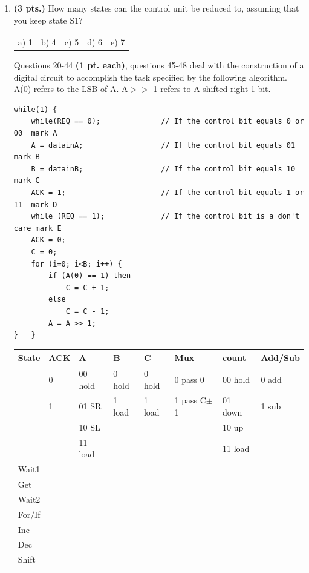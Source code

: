 \documentclass{article}
\begin{document}
\begin{enumerate}
\item {\bf (3 pts.)} How many states can the control unit be
reduced to, assuming that you keep state S1?

\begin{tabular}{p{0.75in}p{0.75in}p{0.75in}p{0.75in}p{0.75in}}
a) 1 & b) 4 & c) 5 & d) 6 & e) 7 \\
\end{tabular}

\pagebreak
Questions 20-44 {\bf (1 pt. each)}, questions 45-48 deal with the construction 
of a digital circuit to accomplish the task specified by the following 
algorithm.  A(0) refers to the LSB of A.  A$>>$ 1 refers to A shifted right 
1 bit.

{\small
\begin{verbatim}
while(1) {
    while(REQ == 0);              // If the control bit equals 0 or 00  mark A 
    A = datainA;                  // If the control bit equals 01       mark B 
    B = datainB;                  // If the control bit equals 10       mark C 
    ACK = 1;                      // If the control bit equals 1 or 11  mark D 
    while (REQ == 1);             // If the control bit is a don't care mark E 
    ACK = 0;
    C = 0;
    for (i=0; i<B; i++) {
        if (A(0) == 1) then
            C = C + 1;
        else 
            C = C - 1;
        A = A >> 1;
}   } 
\end{verbatim}}
\begin{figure}[ht]
\centerline{}
\end{figure}

\begin{tabular}{|l||l|l|l|l|l|l|l|}  \hline
State & ACK & A       & B      & C      & Mux        & count   & Add/Sub \\ \hline
      & 0   & 00 hold & 0 hold & 0 hold & 0 pass 0   & 00 hold & 0 add \\ \hline
      & 1   & 01 SR   & 1 load & 1 load & 1 pass C$\pm$1 & 01 down & 1 sub \\ \hline
      &     & 10 SL   &        &        &            & 10 up   &       \\ \hline
      &     & 11 load &        &        &            & 11 load &       \\ \hline   \hline
Wait1 & \x  &         &        &        &            &         &       \\ \hline
Get   & \x  &  \x     &  \x    &  \x    &  \x        &  \x     & \x    \\ \hline
Wait2 & \x  &  \x     &        &        &  \x        &  \x     &       \\ \hline
For/If &    &         &        &        &            &         &       \\ \hline
Inc   &     &  \x     &        &  \x    &  \x        &         & \x    \\ \hline
Dec   & \x  &         &        &  \x    &  \x        &         & \x    \\ \hline
Shift &     &  \x     &  \x    &  \x    &  \x        &         & \x    \\ \hline
\end{tabular}


\end{enumerate}
\end{document}
